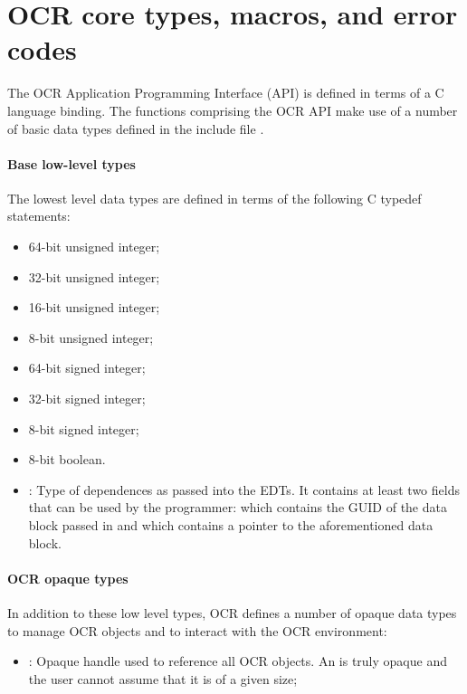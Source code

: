 %

\section{OCR core types, macros, and error codes}
\label{sec:OCRtypesmacros}

The OCR Application Programming Interface (API) is defined in terms of a
C language binding. The functions comprising the OCR API make use of a number of
basic data types defined in the include file .
\paragraph*{Base low-level types}
The lowest level data types are defined in terms of the following C typedef
statements:
\begin{itemize}
\item \hypertarget{type_u64}{} 64-bit unsigned integer;
\item \hypertarget{type_u32}{} 32-bit unsigned integer;
\item \hypertarget{type_u16}{} 16-bit unsigned integer;
\item \hypertarget{type_u8}{} 8-bit unsigned integer;
\item \hypertarget{type_s64}{} 64-bit signed integer;
\item \hypertarget{type_s32}{} 32-bit signed integer;
\item \hypertarget{type_s8}{} 8-bit signed integer;
\item \hypertarget{type_bool}{} 8-bit boolean.
\item \hypertarget{type_ocrEdtDep_t}{}: Type of
  dependences as passed into the EDTs. It contains at least two fields
  that can be used by the programmer:  which contains the
  GUID of the data block passed in and  which contains a
  pointer to the aforementioned data block.
\end{itemize}
\paragraph*{OCR opaque types}
In addition to these low level types, OCR defines a number of opaque data types
to manage OCR objects and to interact with the OCR environment:
\begin{itemize}
\item \hypertarget{type_ocrGuid_t}{}: Opaque handle used to
reference all OCR objects. An  is truly opaque and
the user cannot assume that it is of a given size;
\end{itemize}
